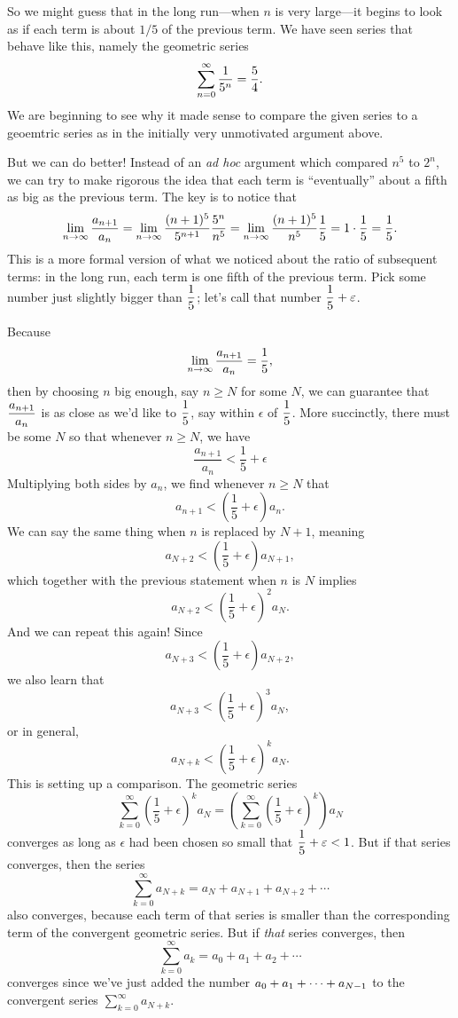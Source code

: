 So we might guess that in the long run---when $n$ is very large---it
begins to look as if each term is about $1/5$ of the previous term. We
have seen series that behave like this, namely the geometric series
$$\sum_{n=0}^\infty {1\over 5^n} = {5\over4}.$$
We are beginning to see why it made sense to compare the given series
to a geoemtric series as in the initially very unmotivated argument
above.

But we can do better!  Instead of an \textit{ad hoc} argument which
compared $n^5$ to $2^n$, we can try to make rigorous the idea that
each term is ``eventually'' about a fifth as big as the previous term.
The key is to notice that
$$
  \lim_{n\to\infty} {a_{n+1}\over a_n}=
  \lim_{n\to\infty} {(n+1)^5\over 5^{n+1}}{5^n\over n^5}=
  \lim_{n\to\infty} {(n+1)^5\over n^5}{1\over 5}=1\cdot {1\over5}
    ={1\over 5}.
$$ 
This is a more formal version of what we noticed about the ratio of
subsequent terms: in the long run, each term is one fifth of the
previous term.  Pick some number just slightly bigger than
$\displaystyle\frac{1}{5}$; let's call that number $\displaystyle\frac{1}{5} + \varepsilon$.


Because
$$\lim_{n\to\infty} {a_{n+1}\over a_n}={1\over5},$$
then by choosing $n$ big enough, say $n\ge N$ for some $N$, we can
guarantee that $\displaystyle\frac{a_{n+1}}{a_n}$ is as close as we'd like to
$\displaystyle\frac{1}{5}$, say within $\epsilon$ of $\displaystyle\frac{1}{5}$.  More
succinctly, there must be some $N$ so that whenever $n \geq N$, we
have
$$
\frac{a_{n+1}}{a_n} < \frac{1}{5} + \epsilon
$$
Multiplying both sides by $a_n$, we find whenever $n \geq N$ that
$$
a_{n+1} <  \left( \frac{1}{5} + \epsilon \right) a_n.
$$
We can say the same thing when $n$ is replaced by $N+1$, meaning
$$
a_{N+2} <  \left( \frac{1}{5} + \epsilon \right) a_{N+1},
$$
which together with the previous statement when $n$ is $N$ implies
$$
a_{N+2} <  \left( \frac{1}{5} + \epsilon \right)^2 a_N.
$$
And we can repeat this again!  Since
$$
a_{N+3} <  \left( \frac{1}{5} + \epsilon \right) a_{N+2},
$$
we also learn that
$$
a_{N+3} <  \left( \frac{1}{5} + \epsilon \right)^3 a_N,
$$
or in general,
$$
a_{N+k} <  \left( \frac{1}{5} + \epsilon \right)^k a_N.
$$
This is setting up a comparison.  The geometric series
$$
\sum_{k=0}^\infty \left( \frac{1}{5} + \epsilon \right)^k a_N = \left( \sum_{k=0}^\infty \left( \frac{1}{5} + \epsilon \right)^k \right) a_N
$$
converges as long as $\epsilon$ had been chosen so small that $\displaystyle\frac{1}{5} + \varepsilon < 1$.  But if that series converges, then the series 
$$
\sum_{k=0}^\infty a_{N+k} = a_N + a_{N+1} + a_{N+2} + \cdots
$$
also converges, because each term of that series is smaller than the corresponding term of the convergent geometric series.  But if \textit{that} series converges, then 
$$
\sum_{k=0}^\infty a_{k} = a_0 + a_{1} + a_{2} + \cdots
$$
converges since we've just added the number $\displaystyle a_0+a_1+\cdots+a_{N-1}$ to the convergent series $\sum_{k=0}^\infty a_{N+k}$.

